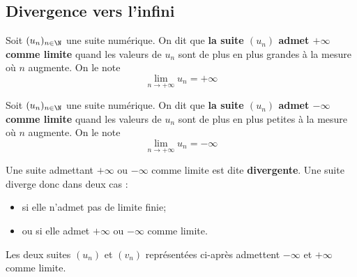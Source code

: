 \documentclass{article}
\begin{document}
\subsection{Divergence vers l'infini}
\begin{tcolorbox}
\begin{definition}
Soit $(u_n)_{n \in \N}$ une suite numérique. On dit que \textbf{la suite $(u_n)$ admet $+\infty$ comme limite} quand les valeurs de $u_n$ sont de plus en plus grandes à la mesure où $n$ augmente. On le note
\begin{equation*}
\lim_{n \to +\infty} u_n = +\infty 
\end{equation*}
\end{definition}    
\end{tcolorbox}
\begin{tcolorbox}
\begin{definition}
Soit $(u_n)_{n \in \N}$ une suite numérique. On dit que \textbf{la suite $(u_n)$ admet $-\infty$ comme limite} quand les valeurs de $u_n$ sont de plus en plus petites à la mesure où $n$ augmente. On le note
\begin{equation*}
\lim_{n \to +\infty} u_n = -\infty 
\end{equation*}
\end{definition}    
\end{tcolorbox}
\begin{remark}
Une suite admettant $+\infty$ ou $-\infty$ comme limite est dite \textbf{divergente}. Une suite diverge donc dans deux cas :
\begin{itemize}
\item si elle n'admet pas de limite finie;
\item ou si elle admet $+\infty$ ou $-\infty$ comme limite.
\end{itemize}
\end{remark}
\begin{example}
Les deux suites $(u_n)$ et $(v_n)$ représentées ci-après admettent $-\infty$ et $+\infty$ comme limite.
\begin{center}
\end{center}
\begin{center}
\end{center}
\end{example}
\end{document}
